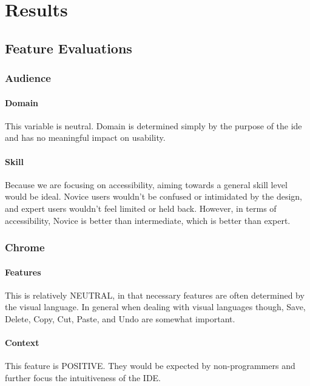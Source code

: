 \section{Results}
\label{sec:results}



\subsection{Feature Evaluations}
\label{sec:feature_evaluations}

\subsubsection{Audience}

\paragraph{Domain} This variable is neutral. Domain is determined simply by
the purpose of the \ac{ide} and has no meaningful impact on usability.

\paragraph{Skill} Because we are focusing on accessibility, aiming towards
a general skill level would be ideal. Novice users wouldn't be confused or
intimidated by the design, and expert users wouldn't feel limited or held
back. However, in terms of accessibility, Novice is better than
intermediate, which is better than expert.


\subsubsection{Chrome}

\paragraph{Features} This is relatively NEUTRAL, in that necessary features
are often determined by the visual language. In general when dealing with
visual languages though, Save, Delete, Copy, Cut, Paste, and Undo are
somewhat important.

\paragraph{Context} This feature is POSITIVE. They would be expected by
non-programmers and further focus the intuitiveness of the IDE.

